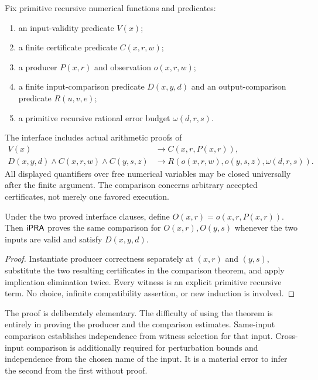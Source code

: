 \begin{definition}
\label{def:interface}
Fix primitive recursive numerical functions and predicates:
\begin{enumerate}
\item an input-validity predicate $V(x)$;
\item a finite certificate predicate $C(x,r,w)$;
\item a producer $P(x,r)$ and observation $o(x,r,w)$;
\item a finite input-comparison predicate $D(x,y,d)$ and an output-comparison predicate $R(u,v,e)$;
\item a primitive recursive rational error budget $\omega(d,r,s)$.
\end{enumerate}
The interface includes actual arithmetic proofs of
\begin{align}
 V(x)&\longrightarrow C(x,r,P(x,r)), \label{eq:producer}\\
 D(x,y,d)\wedge C(x,r,w)\wedge C(y,s,z)
 &\longrightarrow R(o(x,r,w),o(y,s,z),\omega(d,r,s)).
 \label{eq:comparison}
\end{align}
All displayed quantifiers over free numerical variables may be closed universally after the finite argument. The comparison concerns arbitrary accepted certificates, not merely one favored execution.
\end{definition}

\begin{theorem}
\label{thm:observable}
Under the two proved interface clauses, define $O(x,r)=o(x,r,P(x,r))$. Then $\mathsf{iPRA}$ proves the same comparison for $O(x,r),O(y,s)$ whenever the two inputs are valid and satisfy $D(x,y,d)$.
\end{theorem}
\begin{proof}
Instantiate producer correctness separately at $(x,r)$ and $(y,s)$, substitute the two resulting certificates in the comparison theorem, and apply implication elimination twice. Every witness is an explicit primitive recursive term. No choice, infinite compatibility assertion, or new induction is involved.
\end{proof}

The proof is deliberately elementary. The difficulty of using the theorem is entirely in proving the producer and the comparison estimates. Same-input comparison establishes independence from witness selection for that input. Cross-input comparison is additionally required for perturbation bounds and independence from the chosen name of the input. It is a material error to infer the second from the first without proof.

